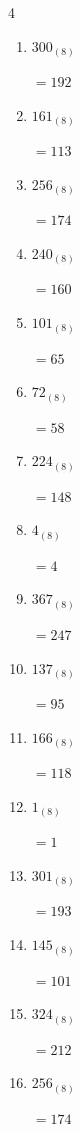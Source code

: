 \begin{multicols}{4}
\begin{enumerate}
  \item $300_{(8)}$

        $=192$

  \item $161_{(8)}$

        $=113$

  \item $256_{(8)}$

        $=174$

  \item $240_{(8)}$

        $=160$

  \item $101_{(8)}$

        $=65$

  \item $72_{(8)}$

        $=58$

  \item $224_{(8)}$

        $=148$

  \item $4_{(8)}$

        $=4$

  \item $367_{(8)}$

        $=247$

  \item $137_{(8)}$

        $=95$

  \item $166_{(8)}$

        $=118$

  \item $1_{(8)}$

        $=1$

\columnbreak %

\resetques

  \item $301_{(8)}$

        $=193$

  \item $145_{(8)}$

        $=101$

  \item $324_{(8)}$

        $=212$

  \item $256_{(8)}$

        $=174$


\end{enumerate}
\end{multicols}

